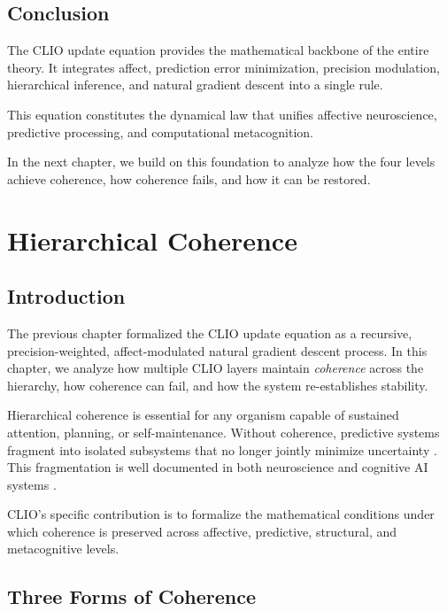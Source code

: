\documentclass[12pt,oneside]{book}
\theoremstyle{plain}
\theoremstyle{definition}
\let\citep\parencite
\begin{document}
\section{Conclusion}

The CLIO update equation provides the mathematical backbone of the entire
theory.
It integrates affect, prediction error minimization, precision modulation,
hierarchical inference, and natural gradient descent into a single rule.

This equation constitutes the dynamical law that unifies affective neuroscience,
predictive processing, and computational metacognition.

In the next chapter, we build on this foundation to analyze how the four levels
achieve coherence, how coherence fails, and how it can be restored.

\chapter{Hierarchical Coherence}

\section{Introduction}

The previous chapter formalized the CLIO update equation as a recursive,
precision-weighted, affect-modulated natural gradient descent process.
In this chapter, we analyze how multiple CLIO layers maintain \emph{coherence}
across the hierarchy, how coherence can fail, and how the system re-establishes
stability.

Hierarchical coherence is essential for any organism capable of sustained
attention, planning, or self-maintenance. Without coherence, predictive systems
fragment into isolated subsystems that no longer jointly minimize uncertainty
\citep{friston2010freeenergy,friston2017active}.
This fragmentation is well documented in both neuroscience
\citep{montague2012computational,corlett2016prediction} and cognitive AI systems
\citep{elman1995nonlinear,levine2020neuronav}.

CLIO’s specific contribution is to formalize the mathematical conditions under
which coherence is preserved across affective, predictive, structural, and
metacognitive levels.

\section{Three Forms of Coherence}
\end{document}

